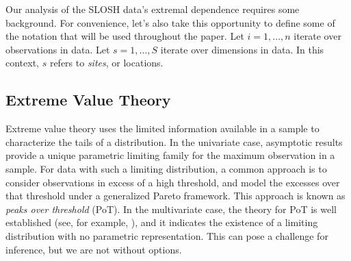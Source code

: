 Our analysis of the SLOSH data's extremal dependence requires some background.  
      For 
    convenience, let's also take this opportunity to define some of the notation 
    that will be used throughout the paper.  Let $i = 1,\ldots,n$ iterate over 
    observations in data.  Let $s = 1,\ldots,S$  iterate over dimensions in data.
    In this context, $s$ refers to \emph{sites}, or locations.

\subsection{Extreme Value Theory\label{ref:evt}}
Extreme value theory uses the limited information available in a sample to
    characterize the tails of a distribution.  In the univariate case, asymptotic
    results provide a unique parametric limiting family for the maximum observation
    in a sample.  For data with such a limiting distribution, a common approach
    is to consider observations in excess of a high threshold, and model the
    excesses over that threshold under a generalized Pareto framework.  This
    approach is known as \emph{peaks over threshold} (PoT).  In the multivariate 
    case, the theory for PoT is well established (see, for example, 
    \cite{dehaan2006}), and it indicates the existence of a limiting distribution
    with no parametric representation.  This can pose a challenge for inference,
    but we are not without options.

